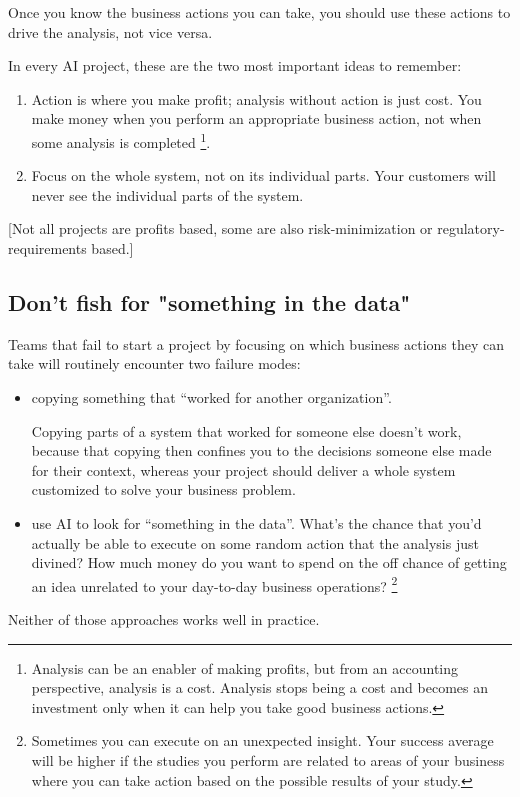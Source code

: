 Once you know the business actions you can take, you should use
these actions to drive the analysis, not vice versa.

In every AI project, these are the two most important ideas to
remember:
\begin{enumerate}
    \item Action is where you make profit; analysis without action
    is just cost. You make money when you perform an appropriate
    business action, not when some analysis is completed
    \footnote{
        Analysis can be an enabler of making profits, but from an
        accounting perspective, analysis is a cost. Analysis stops
        being a cost and becomes an investment only when it can
        help you take good business actions.
    }.

    \item Focus on the whole system, not on its individual parts.
    Your customers will never see the individual parts of the
    system.
\end{enumerate}
[Not all projects are profits based, some are also 
risk-minimization or regulatory-requirements based.]


\subsection{Don't fish for "something in the data"}
Teams that fail to start a project by focusing on which business
actions they can take will routinely encounter two failure modes:
\begin{itemize}
    \item copying something that “worked for another organization”.
    
    Copying parts of a system that worked for someone else doesn't
    work, because that copying then confines you to the decisions
    someone else made for their context, whereas your project
    should deliver a whole system customized to solve your
    business problem.
    
    \item use AI to look for “something in the data”.
    What's the chance that you'd actually be able to execute on
    some random action that the analysis just divined? How much
    money do you want to spend on the off chance of getting an
    idea unrelated to your day-to-day business operations?
    \footnote{
        Sometimes you can execute on an unexpected insight. Your
        success average will be higher if the studies you perform
        are related to areas of your business where you can take
        action based on the possible results of your study.
    }
\end{itemize}
Neither of those approaches works well in practice.


